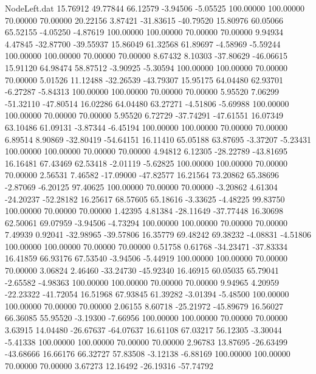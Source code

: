 \begin{filecontents}{NodeLeft.dat}
  15.76912   49.77844   66.12579    -3.94506   -5.05525  100.00000  100.00000   70.00000   70.00000   20.22156    3.87421  -31.83615  -40.79520
  15.80976   60.05066   65.52155    -4.05250   -4.87619  100.00000  100.00000   70.00000   70.00000    9.94934    4.47845  -32.87700  -39.55937
  15.86049   61.32568   61.89697    -4.58969   -5.59244  100.00000  100.00000   70.00000   70.00000    8.67432    8.10303  -37.80629  -46.06615
  15.91120   64.98474   58.87512    -3.90925   -5.30594  100.00000  100.00000   70.00000   70.00000    5.01526   11.12488  -32.26539  -43.79307
  15.95175   64.04480   62.93701    -6.27287   -5.84313  100.00000  100.00000   70.00000   70.00000    5.95520    7.06299  -51.32110  -47.80514
  16.02286   64.04480   63.27271    -4.51806   -5.69988  100.00000  100.00000   70.00000   70.00000    5.95520    6.72729  -37.74291  -47.61551
  16.07349   63.10486   61.09131    -3.87344   -6.45194  100.00000  100.00000   70.00000   70.00000    6.89514    8.90869  -32.80419  -54.64151
  16.11410   65.05188   63.87695    -3.37207   -5.23431  100.00000  100.00000   70.00000   70.00000    4.94812    6.12305  -28.22789  -43.81695
  16.16481   67.43469   62.53418    -2.01119   -5.62825  100.00000  100.00000   70.00000   70.00000    2.56531    7.46582  -17.09000  -47.82577
  16.21564   73.20862   65.38696    -2.87069   -6.20125   97.40625  100.00000   70.00000   70.00000   -3.20862    4.61304  -24.20237  -52.28182
  16.25617   68.57605   65.18616    -3.33625   -4.48225   99.83750  100.00000   70.00000   70.00000    1.42395    4.81384  -28.11649  -37.77448
  16.30698   62.50061   69.07959    -3.94506   -4.73294  100.00000  100.00000   70.00000   70.00000    7.49939    0.92041  -32.98965  -39.57806
  16.35779   69.48242   69.38232    -4.08831   -4.51806  100.00000  100.00000   70.00000   70.00000    0.51758    0.61768  -34.23471  -37.83334
  16.41859   66.93176   67.53540    -3.94506   -5.44919  100.00000  100.00000   70.00000   70.00000    3.06824    2.46460  -33.24730  -45.92340
  16.46915   60.05035   65.79041    -2.65582   -4.98363  100.00000  100.00000   70.00000   70.00000    9.94965    4.20959  -22.23322  -41.72054
  16.51968   67.93845   61.39282    -3.01394   -5.48500  100.00000  100.00000   70.00000   70.00000    2.06155    8.60718  -25.21972  -45.89679
  16.56027   66.36085   55.95520    -3.19300   -7.66956  100.00000  100.00000   70.00000   70.00000    3.63915   14.04480  -26.67637  -64.07637
  16.61108   67.03217   56.12305    -3.30044   -5.41338  100.00000  100.00000   70.00000   70.00000    2.96783   13.87695  -26.63499  -43.68666
  16.66176   66.32727   57.83508    -3.12138   -6.88169  100.00000  100.00000   70.00000   70.00000    3.67273   12.16492  -26.19316  -57.74792

\end{filecontents}
